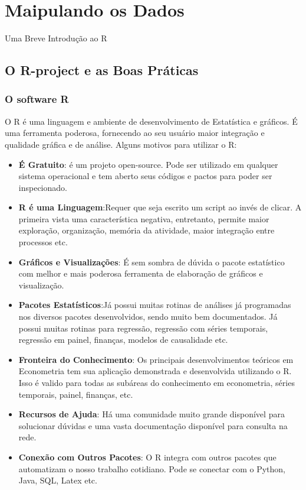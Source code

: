 \documentclass[
  letterpaper,
  DIV=11,
  numbers=noendperiod]{scrreprt}
\begin{document}

\chapter{Maipulando os Dados}\label{maipulando-os-dados}

Uma Breve Introdução ao R

\hfill\break

\section{O R-project e as Boas
Práticas}\label{o-r-project-e-as-boas-pruxe1ticas}

\subsection{O software R}\label{o-software-r}

O R é uma linguagem e ambiente de desenvolvimento de Estatística e
gráficos. É uma ferramenta poderosa, fornecendo ao seu usuário maior
integração e qualidade gráfica e de análise. Alguns motivos para
utilizar o R:

\begin{itemize}
\item
  \textbf{É Gratuito}: é um projeto open-source. Pode ser utilizado em
  qualquer sistema operacional e tem aberto seus códigos e pactos para
  poder ser inspecionado.
\item
  \textbf{R é uma Linguagem}:Requer que seja escrito um script ao invés
  de clicar. A primeira vista uma característica negativa, entretanto,
  permite maior exploração, organização, memória da atividade, maior
  integração entre processos etc.
\item
  \textbf{Gráficos e Visualizações}: É sem sombra de dúvida o pacote
  estatístico com melhor e mais poderosa ferramenta de elaboração de
  gráficos e visualização.
\item
  \textbf{Pacotes Estatísticos}:Já possui muitas rotinas de análises já
  programadas nos diversos pacotes desenvolvidos, sendo muito bem
  documentados. Já possui muitas rotinas para regressão, regressão com
  séries temporais, regressão em painel, finanças, modelos de
  causalidade etc.
\item
  \textbf{Fronteira do Conhecimento}: Os principais desenvolvimentos
  teóricos em Econometria tem sua aplicação demonstrada e desenvolvida
  utilizando o R. Isso é valido para todas as subáreas do conhecimento
  em econometria, séries temporais, painel, finanças, etc.
\item
  \textbf{Recursos de Ajuda}: Há uma comunidade muito grande disponível
  para solucionar dúvidas e uma vasta documentação disponível para
  consulta na rede.
\item
  \textbf{Conexão com Outros Pacotes}: O R integra com outros pacotes
  que automatizam o nosso trabalho cotidiano. Pode se conectar com o
  Python, Java, SQL, Latex etc.
\end{itemize}
\end{document}
